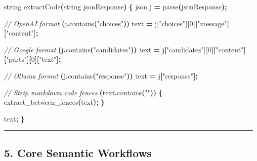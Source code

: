 \documentclass[11pt, a4paper]{article}
\newenvironment{Shaded}{\begin{snugshade}}{\end{snugshade}}
\newcommand{\CommentTok}[1]{\textcolor[rgb]{0.56,0.35,0.01}{\textit{#1}}}
\newcommand{\DecValTok}[1]{\textcolor[rgb]{0.00,0.00,0.81}{#1}}
\newcommand{\NormalTok}[1]{#1}
\newcommand{\OperatorTok}[1]{\textcolor[rgb]{0.81,0.36,0.00}{\textbf{#1}}}
\newcommand{\StringTok}[1]{\textcolor[rgb]{0.31,0.60,0.02}{#1}}
\begin{document}
\begin{Shaded}
\begin{Highlighting}[]
\NormalTok{string extractCode}\OperatorTok{(}\NormalTok{string jsonResponse}\OperatorTok{)} \OperatorTok{\{}
\NormalTok{    json j }\OperatorTok{=}\NormalTok{ parse}\OperatorTok{(}\NormalTok{jsonResponse}\OperatorTok{);}
    
    \CommentTok{// OpenAI format}
     \OperatorTok{(}\NormalTok{j}\OperatorTok{.}\NormalTok{contains}\OperatorTok{(}\StringTok{"choices"}\OperatorTok{))}
\NormalTok{        text }\OperatorTok{=}\NormalTok{ j}\OperatorTok{[}\StringTok{"choices"}\OperatorTok{][}\DecValTok{0}\OperatorTok{][}\StringTok{"message"}\OperatorTok{][}\StringTok{"content"}\OperatorTok{];}
    
    \CommentTok{// Google format}
      \OperatorTok{(}\NormalTok{j}\OperatorTok{.}\NormalTok{contains}\OperatorTok{(}\StringTok{"candidates"}\OperatorTok{))}
\NormalTok{        text }\OperatorTok{=}\NormalTok{ j}\OperatorTok{[}\StringTok{"candidates"}\OperatorTok{][}\DecValTok{0}\OperatorTok{][}\StringTok{"content"}\OperatorTok{][}\StringTok{"parts"}\OperatorTok{][}\DecValTok{0}\OperatorTok{][}\StringTok{"text"}\OperatorTok{];}
    
    \CommentTok{// Ollama format}
      \OperatorTok{(}\NormalTok{j}\OperatorTok{.}\NormalTok{contains}\OperatorTok{(}\StringTok{"response"}\OperatorTok{))}
\NormalTok{        text }\OperatorTok{=}\NormalTok{ j}\OperatorTok{[}\StringTok{"response"}\OperatorTok{];}
    
    \CommentTok{// Strip markdown code fences}
     \OperatorTok{(}\NormalTok{text}\OperatorTok{.}\NormalTok{contains}\OperatorTok{(}\StringTok{"\textasciigrave{}\textasciigrave{}\textasciigrave{}"}\OperatorTok{))} \OperatorTok{\{}
        \NormalTok{ extract\_between\_fences}\OperatorTok{(}\NormalTok{text}\OperatorTok{);}
    \OperatorTok{\}}
    
    \NormalTok{ text}\OperatorTok{;}
\OperatorTok{\}}
\end{Highlighting}
\end{Shaded}

\begin{center}\rule{0.5\linewidth}{0.5pt}\end{center}

\subsection{5. Core Semantic Workflows}\label{core-semantic-workflows}
\end{document}
